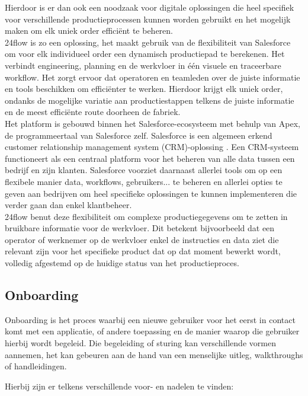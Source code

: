 Hierdoor is er dan ook een noodzaak voor digitale oplossingen die heel specifiek voor verschillende productieprocessen kunnen worden gebruikt en het mogelijk maken om elk uniek order efficiënt te beheren. 
\\

24flow is zo een oplossing, het maakt gebruik van de flexibiliteit van Salesforce om voor elk individueel order een dynamisch productiepad te berekenen. Het verbindt engineering, planning en de werkvloer in één visuele en traceerbare workflow. Het zorgt ervoor dat operatoren en teamleden over de juiste informatie en tools beschikken om efficiënter te werken. Hierdoor krijgt elk uniek order, ondanks de mogelijke variatie aan productiestappen telkens de juiste informatie en de meest efficiënte route doorheen de fabriek.
\\

Het platform is gebouwd binnen het Salesforce-ecosysteem met behulp van Apex, de programmeertaal van Salesforce zelf. Salesforce is een algemeen erkend customer relationship management system (CRM)-oplossing \autocite{Pookandy2024}. Een CRM-systeem functioneert als een centraal platform voor het beheren van alle data tussen een bedrijf en zijn klanten. Salesforce voorziet daarnaast allerlei tools om op een flexibele manier data, workflows, gebruikers... te beheren en allerlei opties te geven aan bedrijven om heel specifieke oplossingen te kunnen implementeren die verder gaan dan enkel klantbeheer. 
\\

24flow benut deze flexibiliteit om complexe productiegegevens om te zetten in bruikbare informatie voor de werkvloer. Dit betekent bijvoorbeeld dat een operator of werknemer op de werkvloer enkel de instructies en data ziet die relevant zijn voor het specifieke product dat op dat moment bewerkt wordt, volledig afgestemd op de huidige status van het productieproces.


\subsection{Onboarding}
Onboarding is het proces waarbij een nieuwe gebruiker voor het eerst in contact komt met een applicatie, of andere toepassing en de manier waarop die gebruiker hierbij wordt begeleid. Die begeleiding of sturing kan verschillende vormen aannemen, het kan gebeuren aan de hand van een menselijke uitleg, walkthroughs of handleidingen. \autocite{Madhwacharyula2023} 

Hierbij zijn er telkens verschillende voor- en nadelen te vinden:

